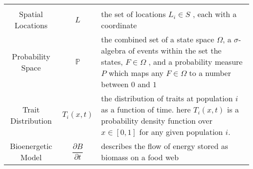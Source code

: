 \documentclass[]{article}
\begin{document}
\begin{longtable}[]{@{}ccl@{}}
\begin{minipage}[t]{0.42\columnwidth}
\end{minipage}\tabularnewline
\begin{minipage}[t]{0.25\columnwidth}\centering
Spatial Locations\strut
\end{minipage} & \begin{minipage}[t]{0.23\columnwidth}\centering
\(L\)\strut
\end{minipage} & \begin{minipage}[t]{0.42\columnwidth}\raggedright
the set of locations \(L_i \in S\) , each with a coordinate\strut
\end{minipage}\tabularnewline
\begin{minipage}[t]{0.25\columnwidth}\centering
Probability Space\strut
\end{minipage} & \begin{minipage}[t]{0.23\columnwidth}\centering
\(\mathbb{P}\)\strut
\end{minipage} & \begin{minipage}[t]{0.42\columnwidth}\raggedright
the combined set of a state space \(\Omega\), a \(\sigma\)-algebra of
events within the set the states, \({F} \in \Omega\) , and a probability
measure \(P\) which maps any \({F} \in \Omega\) to a number between
\(0\) and \(1\)\strut
\end{minipage}\tabularnewline
\begin{minipage}[t]{0.25\columnwidth}\centering
Trait Distribution\strut
\end{minipage} & \begin{minipage}[t]{0.23\columnwidth}\centering
\(T_i(x,t)\)\strut
\end{minipage} & \begin{minipage}[t]{0.42\columnwidth}\raggedright
the distribution of traits at population \(i\) as a function of time.
here \(T_i(x,t)\) is a probability density function over \(x \in [0,1]\)
for any given population \(i\).\strut
\end{minipage}\tabularnewline
\begin{minipage}[t]{0.25\columnwidth}\centering
Bioenergetic Model\strut
\end{minipage} & \begin{minipage}[t]{0.23\columnwidth}\centering
\[\frac{\partial B}{\partial t}\]\strut
\end{minipage} & \begin{minipage}[t]{0.42\columnwidth}\raggedright
describes the flow of energy stored as biomass on a food web\strut
\end{minipage}\tabularnewline

\end{longtable}
\end{document}

